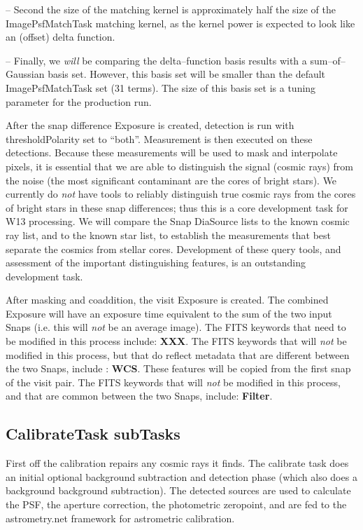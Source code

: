 \documentclass[12pt]{article}
\begin{document}
-- Second the size of the matching kernel is approximately half the
size of the ImagePsfMatchTask matching kernel, as the kernel power is
expected to look like an (offset) delta function.

-- Finally, we {\it will} be comparing the delta--function basis
results with a sum--of--Gaussian basis set.  However, this basis set
will be smaller than the default ImagePsfMatchTask set (31 terms).
The size of this basis set is a tuning parameter for the production
run.

After the snap difference Exposure is created, detection is run with
thresholdPolarity set to ``both''.  Measurement is then executed on
these detections.  Because these measurements will be used to mask and
interpolate pixels, it is essential that we are able to distinguish
the signal (cosmic rays) from the noise (the most significant
contaminant are the cores of bright stars).  We currently do {\it not}
have tools to reliably distinguish true cosmic rays from the cores of
bright stars in these snap differences; thus this is a core
development task for W13 processing.  We will compare the Snap
DiaSource lists to the known cosmic ray list, and to the known star
list, to establish the measurements that best separate the cosmics
from stellar cores.  Development of these query tools, and assessment
of the important distinguishing features, is an outstanding
development task.

After masking and coaddition, the visit Exposure is created.  The
combined Exposure will have an exposure time equivalent to the sum of
the two input Snaps (i.e. this will {\it not} be an average image).
The FITS keywords that need to be modified in this process include:
{\bf XXX}.  The FITS keywords that will {\it not} be modified in this
process, but that do reflect metadata that are different between the
two Snaps, include : {\bf WCS}.  These features will be copied from
the first snap of the visit pair.  The FITS keywords that will {\it
  not} be modified in this process, and that are common between the
two Snaps, include: {\bf Filter}.

\subsection{CalibrateTask subTasks} 
First off the calibration repairs any cosmic rays it finds.
The calibrate task does an initial optional background subtraction and detection phase (which also does a background background subtraction).  The detected sources are used to calculate
the PSF, the aperture correction, the photometric zeropoint, and are fed to the astrometry.net framework for astrometric
calibration.
\end{document}
